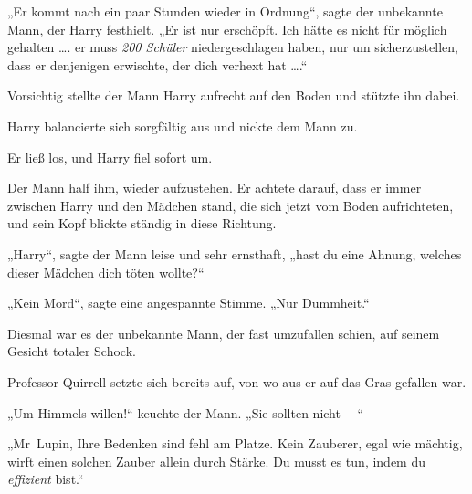 „Er kommt nach ein paar Stunden wieder in Ordnung“, sagte der unbekannte Mann, der Harry festhielt.
„Er ist nur erschöpft. Ich hätte es nicht für möglich gehalten …. er muss \emph{200 Schüler} niedergeschlagen haben, nur um sicherzustellen, dass er denjenigen erwischte, der dich verhext hat ….“

Vorsichtig stellte der Mann Harry aufrecht auf den Boden und stützte ihn dabei.

Harry balancierte sich sorgfältig aus und nickte dem Mann zu.

Er ließ los, und Harry fiel sofort um.

Der Mann half ihm, wieder aufzustehen. Er achtete darauf, dass er immer zwischen Harry und den Mädchen stand, die sich jetzt vom Boden aufrichteten, und sein Kopf blickte ständig in diese Richtung.

„Harry“, sagte der Mann leise und sehr ernsthaft, „hast du eine Ahnung, welches dieser Mädchen dich töten wollte?“

„Kein Mord“, sagte eine angespannte Stimme.
„Nur Dummheit.“

Diesmal war es der unbekannte Mann, der fast umzufallen schien, auf seinem Gesicht totaler Schock.

Professor Quirrell setzte sich bereits auf, von wo aus er auf das Gras gefallen war.

„Um Himmels willen!“ keuchte der Mann.
„Sie sollten nicht —“

„Mr~Lupin, Ihre Bedenken sind fehl am Platze. Kein Zauberer, egal wie mächtig, wirft einen solchen Zauber allein durch Stärke. Du musst es tun, indem du \emph{effizient} bist.“


